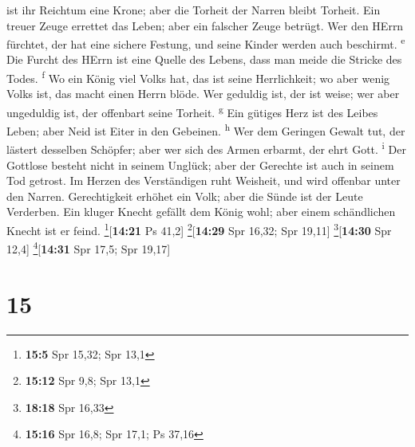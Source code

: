ist ihr Reichtum eine Krone; aber die Torheit der Narren bleibt Torheit.
 Ein treuer Zeuge errettet das Leben; aber ein falscher
Zeuge betrügt.  Wer den HErrn fürchtet, der hat eine
sichere Festung, und seine Kinder werden auch beschirmt.
\textsuperscript{e}  Die Furcht des HErrn ist eine Quelle
des Lebens, dass man meide die Stricke des Todes. \textsuperscript{f}
 Wo ein König viel Volks hat, das ist seine Herrlichkeit;
wo aber wenig Volks ist, das macht einen Herrn blöde. 
Wer geduldig ist, der ist weise; wer aber ungeduldig ist, der offenbart
seine Torheit. \textsuperscript{g}  Ein gütiges Herz ist
des Leibes Leben; aber Neid ist Eiter in den Gebeinen.
\textsuperscript{h}  Wer dem Geringen Gewalt tut, der
lästert desselben Schöpfer; aber wer sich des Armen erbarmt, der ehrt
Gott. \textsuperscript{i}  Der Gottlose besteht nicht in
seinem Unglück; aber der Gerechte ist auch in seinem Tod getrost.
 Im Herzen des Verständigen ruht Weisheit, und wird
offenbar unter den Narren.  Gerechtigkeit erhöhet ein
Volk; aber die Sünde ist der Leute Verderben.  Ein kluger
Knecht gefällt dem König wohl; aber einem schändlichen Knecht ist er
feind. \footnote{\textbf{15:5} Spr 15,32; Spr 13,1}{[}\textbf{14:21} Ps
41,2{]} \footnote{\textbf{15:12} Spr 9,8; Spr 13,1}{[}\textbf{14:29} Spr
16,32; Spr 19,11{]} \footnote{\textbf{18:18} Spr 16,33}{[}\textbf{14:30}
Spr 12,4{]} \footnote{\textbf{15:16} Spr 16,8; Spr 17,1; Ps 37,16}{[}\textbf{14:31}
Spr 17,5; Spr 19,17{]}

\hypertarget{section-14}{%
\section{15}\label{section-14}}

